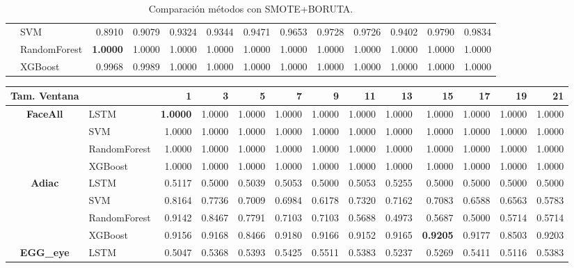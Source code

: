 \begin{table}[h]
\begin{adjustbox}{max width=15cm}
\begin{tabular}{|c|l|r|r|r|r|r|r|r|r|r|r|r|}
	& SVM &  0.8910 &  0.9079 &  0.9324 &  0.9344 &  0.9471 &  0.9653 &  0.9728 &  0.9726 &  0.9402 &  0.9790 &  0.9834 \\
	& RandomForest &  \textbf{1.0000} &  1.0000 &  1.0000 &  1.0000 &  1.0000 &  1.0000 &  1.0000 &  1.0000 &  1.0000 &  1.0000 &  1.0000 \\
	& XGBoost &  0.9968 &  0.9989 &  1.0000 &  1.0000 &  1.0000 &  1.0000 &  1.0000 &  1.0000 &  1.0000 &  1.0000 &  1.0000 \\
	\hline
\end{tabular}
\end{adjustbox}
\caption{Comparación métodos con SMOTE+BORUTA.}
\label{tab:all_comp_smote_boruta}
\end{table}
\newpage
\begin{table}[h]
\centering
\begin{adjustbox}{max width=15cm}
\begin{tabular}{|c|l|r|r|r|r|r|r|r|r|r|r|r|}
		\hline
		\textbf{Tam. Ventana}&         &      1  &      3  &      5  &      7  &      9  &      11 &      13 &      15 &      17 &      19 &      21 \\
		\hline
		\textbf{FaceAll} & LSTM &  \textbf{1.0000} &  1.0000 &  1.0000 &  1.0000 &  1.0000 &  1.0000 &  1.0000 &  1.0000 &  1.0000 &  1.0000 &  1.0000 \\
		& SVM &  1.0000 &  1.0000 &  1.0000 &  1.0000 &  1.0000 &  1.0000 &  1.0000 &  1.0000 &  1.0000 &  1.0000 &  1.0000 \\
		& RandomForest &  1.0000 &  1.0000 &  1.0000 &  1.0000 &  1.0000 &  1.0000 &  1.0000 &  1.0000 &  1.0000 &  1.0000 &  1.0000 \\
		& XGBoost &  1.0000 &  1.0000 &  1.0000 &  1.0000 &  1.0000 &  1.0000 &  1.0000 &  1.0000 &  1.0000 &  1.0000 &  1.0000 \\
		\hline
		\textbf{Adiac} & LSTM &  0.5117 &  0.5000 &  0.5039 &  0.5053 &  0.5000 &  0.5053 &  0.5255 &  0.5000 &  0.5000 &  0.5000 &  0.5000 \\
		& SVM &  0.8164 &  0.7736 &  0.7009 &  0.6984 &  0.6178 &  0.7320 &  0.7162 &  0.7083 &  0.6588 &  0.6563 &  0.5783 \\
		& RandomForest &  0.9142 &  0.8467 &  0.7791 &  0.7103 &  0.7103 &  0.5688 &  0.4973 &  0.5687 &  0.5000 &  0.5714 &  0.5714 \\
		& XGBoost &  0.9156 &  0.9168 &  0.8466 &  0.9180 &  0.9166 &  0.9152 &  0.9165 &  \textbf{0.9205} &  0.9177 &  0.8503 &  0.9203 \\
		\hline
		\textbf{EGG\_eye} & LSTM &  0.5047 &  0.5368 &  0.5393 &  0.5425 &  0.5511 &  0.5383 &  0.5237 &  0.5269 &  0.5411 &  0.5116 &  0.5383 \\

\end{tabular}
\end{adjustbox}
\end{table}
